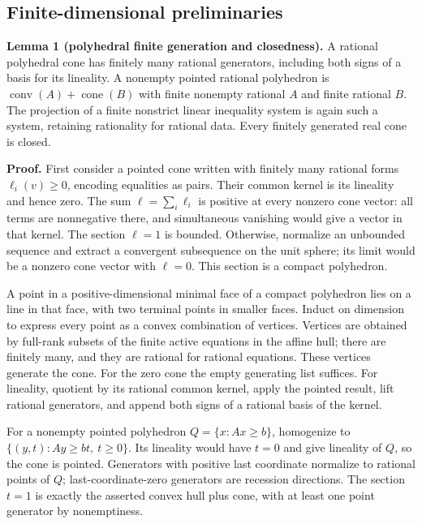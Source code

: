 \documentclass[
  10pt,
]{article}
\begin{document}
\subsection{Finite-dimensional
preliminaries}\label{finite-dimensional-preliminaries}

\textbf{Lemma 1 (polyhedral finite generation and closedness).} A
rational polyhedral cone has finitely many rational generators,
including both signs of a basis for its lineality. A nonempty pointed
rational polyhedron is \(\operatorname{conv}(A)+\operatorname{cone}(B)\)
with finite nonempty rational \(A\) and finite rational \(B\). The
projection of a finite nonstrict linear inequality system is again such
a system, retaining rationality for rational data. Every finitely
generated real cone is closed.

\textbf{Proof.} First consider a pointed cone written with finitely many
rational forms \(\ell_i(v)\geq0\), encoding equalities as pairs. Their
common kernel is its lineality and hence zero. The sum
\(\ell=\sum_i\ell_i\) is positive at every nonzero cone vector: all
terms are nonnegative there, and simultaneous vanishing would give a
vector in that kernel. The section \(\ell=1\) is bounded. Otherwise,
normalize an unbounded sequence and extract a convergent subsequence on
the unit sphere; its limit would be a nonzero cone vector with
\(\ell=0\). This section is a compact polyhedron.

A point in a positive-dimensional minimal face of a compact polyhedron
lies on a line in that face, with two terminal points in smaller faces.
Induct on dimension to express every point as a convex combination of
vertices. Vertices are obtained by full-rank subsets of the finite
active equations in the affine hull; there are finitely many, and they
are rational for rational equations. These vertices generate the cone.
For the zero cone the empty generating list suffices. For lineality,
quotient by its rational common kernel, apply the pointed result, lift
rational generators, and append both signs of a rational basis of the
kernel.

For a nonempty pointed polyhedron \(Q=\{x:Ax\geq b\}\), homogenize to
\(\{(y,t):Ay\geq bt,\ t\geq0\}\). Its lineality would have \(t=0\) and
give lineality of \(Q\), so the cone is pointed. Generators with
positive last coordinate normalize to rational points of \(Q\);
last-coordinate-zero generators are recession directions. The section
\(t=1\) is exactly the asserted convex hull plus cone, with at least one
point generator by nonemptiness.
\end{document}
